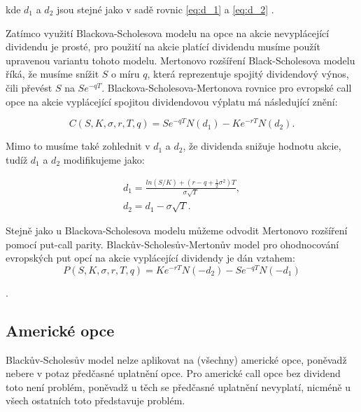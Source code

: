 \documentclass[male,czech,api_bc]{kitheses}
\begin{document}
  kde $d_1$ a $d_2$ jsou stejné jako v sadě rovnic \eqref{eq:d_1} a \eqref{eq:d_2} \parencites[s.~366]{McDonald2013}[rovnice~1.2]{Haug2007}. 

  Zatímco využití Blackova-Scholesova modelu na opce na akcie nevyplácející dividendu je prosté, pro použití na akcie platící dividendu musíme použít upravenou variantu tohoto modelu. Mertonovo rozšíření Black-Scholesova modelu říká, že musíme snížit $S$ o míru $q$, která reprezentuje spojitý dividendový výnos, čili převést $S$ na $Se^{-qT}$. 
  Blackova-Scholesova-Mertonova rovnice pro evropské call opce na akcie vyplácející spojitou dividendovou výplatu má následující znění:

  \begin{equation}
    C(S, K, \sigma, r, T, q) = Se^{-qT}N(d_1) - Ke^{-rT}N(d_2).
  \end{equation}

  \parencites[kapitola~15.1]{McDonald2013}[rovnice~1.11]{Haug2007}

  Mimo to musíme také zohlednit v $d_1$ a $d_2$, že dividenda snižuje hodnotu akcie, tudíž $d_1$ a $d_2$ modifikujeme jako:

  \begin{gather}
    d_1 = \frac{ln(S/K) + (r - q + \frac{1}{2}\sigma^2)T}{\sigma \sqrt{T}}, \\
    d_2 = d_1 - \sigma \sqrt{T}.
  \end{gather}

  Stejně jako u Blackova-Scholesova modelu můžeme odvodit Mertonovo rozšíření pomocí put-call parity. Blackův-Scholesův-Mertonův model pro ohodnocování evropských put opcí na akcie vyplácející dividendy je dán vztahem:
  \begin{equation}
    P(S, K, \sigma, r, T, q) = Ke^{-rT}N(-d_2) - Se^{-qT}N(-d_1)
  \end{equation}

  \parencites[rovnice~1.12]{Haug2007}.

  \subsection{Americké opce}

  \label{sec:bs_american}
  Blackův-Scholesův model nelze aplikovat na (všechny) americké opce, poněvadž nebere v potaz předčasné uplatnění opce. Pro americké call opce bez dividend toto není problém, poněvadž u těch se předčasné uplatnění nevyplatí, nicméně u všech ostatních toto představuje problém. 
\end{document}
